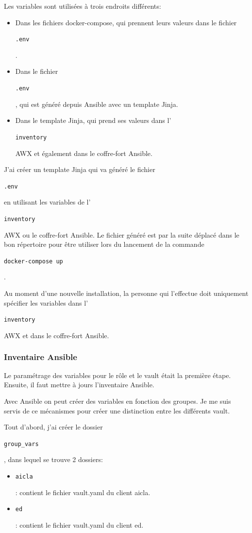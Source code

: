 \documentclass[12pt]{article}
\begin{document}
Les variables sont utilisées à trois endroits différents:
\begin{itemize}
    \item Dans les fichiers docker-compose, qui prennent leurs valeurs dans le fichier \begin{code}\texttt{.env}\end{code}.
    \item Dans le fichier \begin{code}\texttt{.env}\end{code}, qui est généré depuis \gls{Ansible} avec un template \gls{Jinja}.
    \item Dans le template \gls{Jinja}, qui prend ses valeurs dans l'\begin{code}\texttt{inventory}\end{code} AWX et également dans le coffre-fort \gls{Ansible}.
\end{itemize}

J'ai créer un template \gls{Jinja} qui va généré le fichier \begin{code}\texttt{.env}\end{code} en utilisant les variables de l'\begin{code}\texttt{inventory}\end{code} AWX ou le coffre-fort \gls{Ansible}.
Le fichier généré est par la suite déplacé dans le bon répertoire pour être utiliser lors du lancement de la commande \begin{code}\texttt{docker-compose up}\end{code}. 

Au moment d'une nouvelle installation, la personne qui l'effectue doit uniquement spécifier les variables dans l'\begin{code}\texttt{inventory}\end{code} AWX et dans le coffre-fort \gls{Ansible}.

\subsubsection{Inventaire \gls{Ansible}}
Le paramétrage des variables pour le rôle et le vault était la première étape. 
Ensuite, il faut mettre à jours l'inventaire \gls{Ansible}.

Avec \gls{Ansible} on peut créer des variables en fonction des groupes.
Je me suis servis de ce mécanismes pour créer une distinction entre les différents vault.

Tout d'abord, j'ai créer le dossier \begin{code}\texttt{group\_vars}\end{code}, dans lequel se trouve 2 dossiers:
\begin{itemize}
    \item  \begin{code}\texttt{aicla}\end{code}: contient le fichier vault.yaml du client aicla.
    \item  \begin{code}\texttt{ed}\end{code}: contient le fichier vault.yaml du client ed.
\end{itemize}
\end{document}
